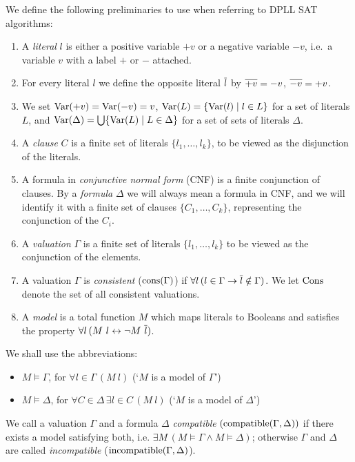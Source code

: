 \begin{mydef}[Preliminaries]
We define the following preliminaries to use when referring to DPLL SAT algorithms:

\begin{enumerate}
\item A \emph{literal} $l$ is either a positive variable $+v$ or a negative variable $-v$, i.e.\ a variable $v$ with a label $+$ or ${-}$ attached.

\item For every literal $l$ we define the opposite literal $\overline{l}$ by $\overline{+v}= -v$, $\overline{-v} = +v$. 

\item We set $\mathrm{Var}(+v) = \mathrm{Var}(-v) = v$, $\mathrm{Var}(L) = \{\mathrm{Var}(l) \mid l\in L\}$
for a set of literals $L$, and 
$\mathrm{Var}(\Delta) = \bigcup\{\mathrm{Var}(L)\mid L\in\Delta\}$ for a set of sets of 
literals $\Delta$.

\item A \emph{clause} $C$ is a finite set of literals 
$\{ l_1, \ldots , l_k \}$, to be viewed as the disjunction of the literals.

\item A formula in \emph{conjunctive normal form} (CNF) is a 
finite conjunction of clauses. 
%
By a \emph{formula} $\Delta$ we will always mean a formula in CNF,
and we will identify it with a finite set of clauses 
$\{ C_1 , \ldots , C_k \}$, representing the conjunction of the $C_i$.

\item A \emph{valuation} $\Gamma$ is a finite set of literals $\{ l_1, \ldots , l_k \}$ to be viewed as the conjunction of the elements.

\item A valuation $\Gamma$ is \emph{consistent} ($\mathrm{cons}(\Gamma)$) if 
%
$\forall l \,( l \in \Gamma \to \overline{l} \notin \Gamma)$.
We let $\mathrm{Cons}$ denote the set of all consistent valuations.


\item A \emph{model} is a total function $M$ which maps literals to Booleans and satisfies the property
%
$\forall l \, (M \ l \leftrightarrow \neg M \ \mybar{l})$.
%
\end{enumerate}
%
We shall use the abbreviations: 
%
\begin{itemize}
%
\item $M \models \Gamma$, for $\forall l \in \Gamma \, (M \ l)$ 
(`$M$ is a model of $\Gamma$')
%
\item $M \models \Delta$, for 
$\forall C \in \Delta \, \exists l \in C \,(M \ l)$ 
(`$M$ is a model of $\Delta$')
%
\end{itemize}
%
We call a valuation $\Gamma$ and a formula $\Delta$ \emph{compatible} 
$(\mathrm{compatible}(\Gamma,\Delta))$
if there exists a model satisfying both, i.e. 
$\exists M \, (M \models \Gamma \wedge M\models \Delta)$;
otherwise $\Gamma$ and $\Delta$ are called \emph{incompatible} 
($\mathrm{incompatible}(\Gamma,\Delta)$).


\end{mydef}
